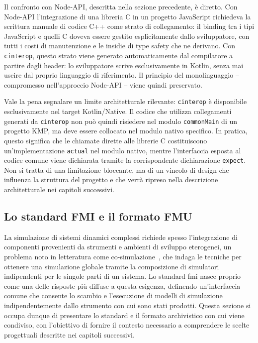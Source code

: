 Il confronto con Node-API, descritta nella sezione precedente, è diretto. Con Node-API l'integrazione di una libreria C in un progetto JavaScript richiedeva la scrittura manuale di codice C++ come strato di collegamento: il binding tra i tipi JavaScript e quelli C doveva essere gestito esplicitamente dallo sviluppatore, con tutti i costi di manutenzione e le insidie di type safety che ne derivano. Con \texttt{cinterop}, questo strato viene generato automaticamente dal compilatore a partire dagli header: lo sviluppatore scrive esclusivamente in Kotlin, senza mai uscire dal proprio linguaggio di riferimento. Il principio del monolinguaggio -- compromesso nell'approccio Node-API -- viene quindi preservato.

Vale la pena segnalare un limite architetturale rilevante: \texttt{cinterop} è disponibile esclusivamente nel target Kotlin/Native. Il codice che utilizza collegamenti generati da \texttt{cinterop} non può quindi risiedere nel modulo \texttt{commonMain} di un progetto KMP, ma deve essere collocato nel modulo nativo specifico. In pratica, questo significa che le chiamate dirette alle librerie C costituiscono un'implementazione \texttt{actual} nel modulo nativo, mentre l'interfaccia esposta al codice comune viene dichiarata tramite la corrispondente dichiarazione \texttt{expect}. Non si tratta di una limitazione bloccante, ma di un vincolo di design che influenza la struttura del progetto e che verrà ripreso nella descrizione architetturale nei capitoli successivi.

\subsection{Lo standard FMI e il formato FMU}
\label{sec:background-fmi}

La simulazione di sistemi dinamici complessi richiede spesso l'integrazione di componenti provenienti da strumenti e ambienti di sviluppo eterogenei, un problema noto in letteratura come co-simulazione~\cite{DBLP:journals/csur/GomesTBLV18}, che indaga le tecniche per ottenere una simulazione globale tramite la composizione di simulatori indipendenti per le singole parti di un sistema. Lo standard \ac{fmi} nasce proprio come una delle risposte più diffuse a questa esigenza, definendo un'interfaccia comune che consente lo scambio e l'esecuzione di modelli di simulazione indipendentemente dallo strumento con cui sono stati prodotti. Questa sezione si occupa dunque di presentare lo standard e il formato archivistico con cui viene condiviso, con l'obiettivo di fornire il contesto necessario a comprendere le scelte progettuali descritte nei capitoli successivi.

